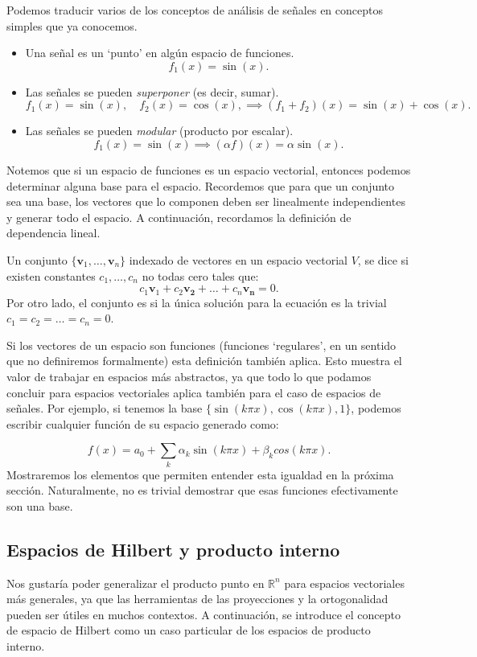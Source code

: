 \documentclass[12pt]{book}
\begin{document}
Podemos traducir varios de los conceptos de análisis de señales en conceptos simples que ya conocemos. 

\begin{itemize}
    \item Una señal es un `punto' en algún espacio de funciones.
    \[
        f_1(x)=\sin(x).
    \]
    \item Las señales se pueden \textit{superponer} (es decir, sumar).
    \[
        f_1(x)=\sin(x),\quad f_2(x)=\cos(x),\implies(f_1+f_2)(x)=\sin(x)+\cos(x).
    \]
    \item Las señales se pueden \textit{modular} (producto por escalar).
    \[
        f_1(x)=\sin(x) \implies (\alpha f)(x)=\alpha \sin(x).
    \]
\end{itemize}

Notemos que si un espacio de funciones es un espacio vectorial, entonces podemos determinar alguna base para el espacio. Recordemos que para que un conjunto sea una base, los vectores que lo componen deben ser linealmente independientes y generar todo el espacio. A continuación, recordamos la definición de dependencia lineal.

\begin{definitionenv}
    Un conjunto $\{\mathbf{v}_1,\dots,\mathbf{v}_n\}$ indexado de vectores en un espacio vectorial $V$, se dice  si existen constantes $c_1,\dots,c_n$ no todas cero tales que:
    \[
        c_1\mathbf{v}_1+c_2\mathbf{v_2}+\dots+c_n\mathbf{v_n}=0.
    \]
    Por otro lado, el conjunto es  si la única solución para la ecuación es la trivial $c_1=c_2=\dots=c_n=0$.
\end{definitionenv}

Si los vectores de un espacio son funciones (funciones `regulares', en un sentido que no definiremos formalmente) esta definición también aplica. Esto muestra el valor de trabajar en espacios más abstractos, ya que todo lo que podamos concluir para espacios vectoriales aplica también para el caso de espacios de señales. Por ejemplo, si tenemos la base $\{\sin(k\pi x),\cos(k\pi x),1\}$, podemos escribir cualquier función de su espacio generado como:

\[
    f(x)=a_0+\sum_k \alpha_k \sin(k\pi x) + \beta_k cos(k\pi x).
\]
Mostraremos los elementos que permiten entender esta igualdad en la próxima sección. Naturalmente, no es trivial demostrar que esas funciones efectivamente son una base.

\subsection{Espacios de Hilbert y producto interno}
\noindent
Nos gustaría poder generalizar el producto punto en $\mathbb{R}^n$ para espacios vectoriales más generales, ya que las herramientas de las proyecciones y la ortogonalidad pueden ser útiles en muchos contextos. A continuación, se introduce el concepto de espacio de Hilbert como un caso particular de los espacios de producto interno.
\end{document}
